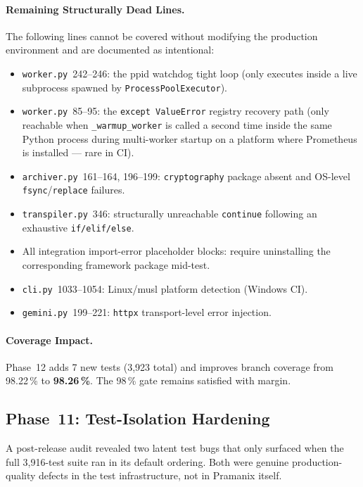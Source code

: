 \documentclass[12pt,a4paper,oneside]{report}
\newcommand{\fname}[1]{\texttt{#1}}          %
\newcommand{\code}[1]{\texttt{#1}}           %
\begin{document}
\paragraph{Remaining Structurally Dead Lines.}  The following lines cannot be
covered without modifying the production environment and are documented as
intentional:

\begin{itemize}
\item \fname{worker.py}~242--246: the ppid watchdog tight loop (only executes
  inside a live subprocess spawned by \code{ProcessPoolExecutor}).
\item \fname{worker.py}~85--95: the \code{except~ValueError} registry
  recovery path (only reachable when \code{\_warmup\_worker} is called a
  second time inside the same Python process during multi-worker startup
  on a platform where Prometheus is installed — rare in CI).
\item \fname{archiver.py}~161--164, 196--199: \code{cryptography} package
  absent and OS-level \code{fsync}/\code{replace} failures.
\item \fname{transpiler.py}~346: structurally unreachable \code{continue}
  following an exhaustive \code{if/elif/else}.
\item All integration import-error placeholder blocks: require uninstalling
  the corresponding framework package mid-test.
\item \fname{cli.py}~1033--1054: Linux/musl platform detection (Windows CI).
\item \fname{gemini.py}~199--221: \code{httpx} transport-level error
  injection.
\end{itemize}

\paragraph{Coverage Impact.}  Phase~12 adds 7 new tests (3,923 total) and
improves branch coverage from 98.22\,\% to \textbf{98.26\,\%}.  The 98\,\%
gate remains satisfied with margin.

\subsection*{Phase~11: Test-Isolation Hardening}

A post-release audit revealed two latent test bugs that only surfaced when the
full 3,916-test suite ran in its default ordering.  Both were genuine
production-quality defects in the test infrastructure, not in Pramanix itself.
\end{document}

